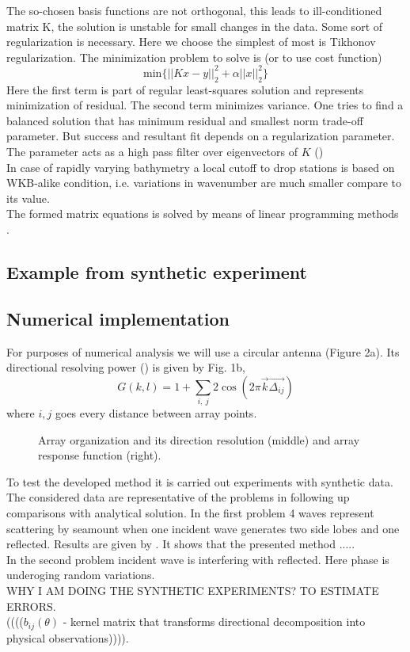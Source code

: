 The so-chosen basis functions are not orthogonal, this leads to ill-conditioned matrix K, the solution is unstable for small changes in the data. Some sort of regularization is necessary. Here we choose the simplest of most is Tikhonov regularization. The minimization problem to solve is (or to use cost function)
\begin{equation}
\label{Tikh_prob}
\text{min}\{||K x - y||^2_2 + \alpha ||x||^2_2\}
\end{equation}
Here the first term is part of regular least-squares solution and represents minimization of residual. The second term minimizes variance. One tries to find a balanced solution that has minimum residual and smallest norm trade-off parameter.
But success and resultant fit depends on a regularization parameter. The parameter acts as a high pass filter over eigenvectors of $K$ (\cite{williams2001regularization})\\
In case of rapidly varying bathymetry a local cutoff to drop stations is based on WKB-alike condition, i.e. variations in wavenumber are much smaller compare to its value.\\
The formed matrix equations is solved by means of linear programming methods \cite{haskell1981algorithm}.\\

\subsection{Example from synthetic experiment}


\subsection{Numerical implementation}
For purposes of numerical analysis we will use a circular antenna (Figure 2a). Its directional resolving power (\cite{barber1963directional}) is given by Fig. 1b,
\begin{equation}
G(k,l) = 1 + \sum_{i,~j} 2\cos(2\pi \vec{k} \vec{\Delta_{ij}})
\end{equation}
where $i,j$ goes every distance between array points.\\
\begin{figure}
\caption{Array organization and its direction resolution (middle) and array response function (right).}
\end{figure}
To test the developed method it is carried out experiments with synthetic data. The considered data are representative of the problems in following up comparisons with analytical solution. In the first problem 4 waves represent scattering by seamount when one incident wave generates two side lobes and one reflected. Results are given by . It shows that the presented method .....\\
In the second problem incident wave is interfering with reflected. Here phase is underoging random variations.\\
WHY I AM DOING THE SYNTHETIC EXPERIMENTS? TO ESTIMATE ERRORS.\\
\small{(((($b_{ij}(\theta)$ - kernel matrix that transforms directional decomposition into physical observations)))).}\\

